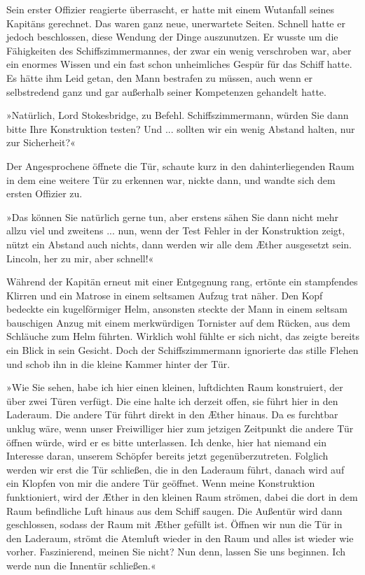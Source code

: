 Sein erster Offizier reagierte überrascht, er hatte mit einem
Wutanfall seines Kapitäns gerechnet. Das waren ganz neue,
unerwartete Seiten. Schnell hatte er jedoch beschlossen, diese
Wendung der Dinge auszunutzen. Er wusste um die Fähigkeiten des
Schiffszimmermannes, der zwar ein wenig verschroben war, aber ein
enormes Wissen und ein fast schon unheimliches Gespür für das
Schiff hatte. Es hätte ihm Leid getan, den Mann bestrafen zu
müssen, auch wenn er selbstredend ganz und gar außerhalb seiner
Kompetenzen gehandelt hatte.

»Natürlich, Lord Stokesbridge, zu Befehl. Schiffszimmermann, würden
Sie dann bitte Ihre Konstruktion testen? Und ... sollten wir ein
wenig Abstand halten, nur zur Sicherheit?«

Der Angesprochene öffnete die Tür, schaute kurz in den
dahinterliegenden Raum in dem eine weitere Tür zu erkennen war,
nickte dann, und wandte sich dem ersten Offizier zu.

»Das können Sie natürlich gerne tun, aber erstens sähen Sie dann
nicht mehr allzu viel und zweitens ... nun, wenn der Test Fehler in
der Konstruktion zeigt, nützt ein Abstand auch nichts, dann werden
wir alle dem Æther ausgesetzt sein. Lincoln, her zu mir, aber
schnell!«

Während der Kapitän erneut mit einer Entgegnung rang, ertönte ein
stampfendes Klirren und ein Matrose in einem seltsamen Aufzug trat
näher. Den Kopf bedeckte ein kugelförmiger Helm, ansonsten steckte
der Mann in einem seltsam bauschigen Anzug mit einem merkwürdigen
Tornister auf dem Rücken, aus dem Schläuche zum Helm führten.
Wirklich wohl fühlte er sich nicht, das zeigte bereits ein Blick in
sein Gesicht. Doch der Schiffszimmermann ignorierte das stille
Flehen und schob ihn in die kleine Kammer hinter der Tür.

»Wie Sie sehen, habe ich hier einen kleinen, luftdichten Raum
konstruiert, der über zwei Türen verfügt. Die eine halte ich
derzeit offen, sie führt hier in den Laderaum. Die andere Tür führt
direkt in den Æther hinaus. Da es furchtbar unklug wäre, wenn unser
Freiwilliger hier zum jetzigen Zeitpunkt die andere Tür öffnen
würde, wird er es bitte unterlassen. Ich denke, hier hat niemand
ein Interesse daran, unserem Schöpfer bereits jetzt
gegenüberzutreten. Folglich werden wir erst die Tür schließen, die
in den Laderaum führt, danach wird auf ein Klopfen von mir die
andere Tür geöffnet. Wenn meine Konstruktion funktioniert, wird der
Æther in den kleinen Raum strömen, dabei die dort in dem Raum
befindliche Luft hinaus aus dem Schiff saugen. Die Außentür wird
dann geschlossen, sodass der Raum mit Æther gefüllt ist. Öffnen wir
nun die Tür in den Laderaum, strömt die Atemluft wieder in den Raum
und alles ist wieder wie vorher. Faszinierend, meinen Sie nicht?
Nun denn, lassen Sie uns beginnen. Ich werde nun die Innentür
schließen.«


